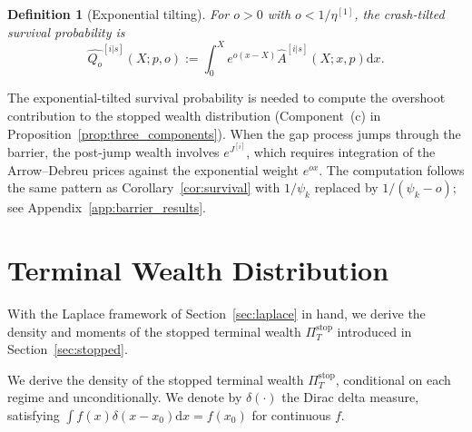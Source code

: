 \documentclass[11pt,a4paper]{article}
\numberwithin{equation}{section}
\newtheorem{definition}[theorem]{Definition}
\newcommand{\dd}{\mathrm{d}}
\begin{document}
\begin{definition}[Exponential tilting]\label{def:tilting}
For $o > 0$ with $o < 1/\eta^{[1]}$, the crash-tilted survival probability is
\begin{equation}\label{eq:tilted_survival}
\widehat{Q_o}^{[i|s]}(X; p, o) := \int_0^X e^{o(x-X)} \hat{A}^{[i|s]}(X; x, p) \dd x.
\end{equation}
\end{definition}

The exponential-tilted survival probability is needed to compute the overshoot contribution to the stopped wealth distribution (Component~(c) in Proposition~\ref{prop:three_components}). When the gap process jumps through the barrier, the post-jump wealth involves $e^{J^{[i]}}$, which requires integration of the Arrow--Debreu prices against the exponential weight $e^{ox}$. The computation follows the same pattern as Corollary~\ref{cor:survival} with $1/\psi_k$ replaced by $1/(\psi_k - o)$; see Appendix~\ref{app:barrier_results}.


\section{Terminal Wealth Distribution}\label{sec:terminal_dist}

With the Laplace framework of Section~\ref{sec:laplace} in hand, we derive the density and moments of the stopped terminal wealth $\Pi^{\mathrm{stop}}_T$ introduced in Section~\ref{sec:stopped}.


We derive the density of the stopped terminal wealth $\Pi^{\mathrm{stop}}_T$, conditional on each regime and unconditionally. We denote by $\delta(\cdot)$ the Dirac delta measure, satisfying $\int f(x)\delta(x - x_0)\dd x = f(x_0)$ for continuous $f$.
\end{document}
